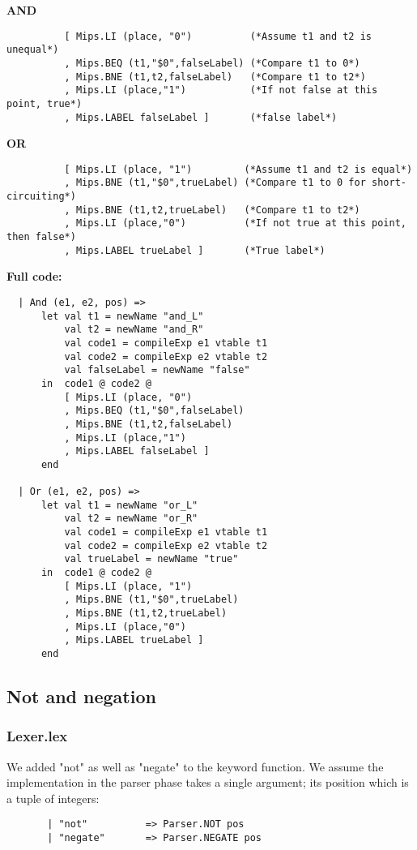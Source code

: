 \documentclass[12pt]{article}
\begin{document}
\textbf{AND}
\begin{verbatim}
          [ Mips.LI (place, "0")          (*Assume t1 and t2 is unequal*)
          , Mips.BEQ (t1,"$0",falseLabel) (*Compare t1 to 0*)
          , Mips.BNE (t1,t2,falseLabel)   (*Compare t1 to t2*)
          , Mips.LI (place,"1")           (*If not false at this point, true*)
          , Mips.LABEL falseLabel ]       (*false label*) 
\end{verbatim}

\textbf{OR}
\begin{verbatim}
          [ Mips.LI (place, "1")         (*Assume t1 and t2 is equal*)
          , Mips.BNE (t1,"$0",trueLabel) (*Compare t1 to 0 for short-circuiting*)
          , Mips.BNE (t1,t2,trueLabel)   (*Compare t1 to t2*)
          , Mips.LI (place,"0")          (*If not true at this point, then false*)
          , Mips.LABEL trueLabel ]       (*True label*)
\end{verbatim}
\clearpage
\textbf{Full code:}
\begin{verbatim}
  | And (e1, e2, pos) =>
      let val t1 = newName "and_L"
          val t2 = newName "and_R"
          val code1 = compileExp e1 vtable t1
          val code2 = compileExp e2 vtable t2
          val falseLabel = newName "false"
      in  code1 @ code2 @
          [ Mips.LI (place, "0")
          , Mips.BEQ (t1,"$0",falseLabel)
          , Mips.BNE (t1,t2,falseLabel)
          , Mips.LI (place,"1") 
          , Mips.LABEL falseLabel ]
      end
      
  | Or (e1, e2, pos) =>
      let val t1 = newName "or_L"
          val t2 = newName "or_R"
          val code1 = compileExp e1 vtable t1
          val code2 = compileExp e2 vtable t2
          val trueLabel = newName "true"
      in  code1 @ code2 @
          [ Mips.LI (place, "1")
          , Mips.BNE (t1,"$0",trueLabel)
          , Mips.BNE (t1,t2,trueLabel)
          , Mips.LI (place,"0")
          , Mips.LABEL trueLabel ]
      end
\end{verbatim}


\subsection{Not and negation}
\subsubsection{Lexer.lex}
We added "not" as well as "negate" to the keyword function. We assume the implementation in the parser phase takes a single argument; its position which is a tuple of integers:
\begin{verbatim}
       | "not"          => Parser.NOT pos
       | "negate"       => Parser.NEGATE pos
\end{verbatim}
\end{document}
